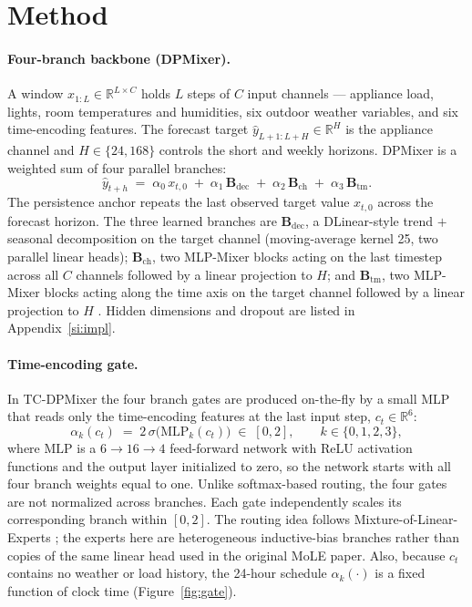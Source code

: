 \documentclass{article}
\begin{document}
\section{Method}
\label{sec:method}

\paragraph{Four-branch backbone (DPMixer).}
A window $x_{1:L}\in\mathbb{R}^{L\times C}$ holds $L$ steps of $C$
input channels --- appliance load, lights, room temperatures and
humidities, six outdoor weather variables, and six time-encoding
features. The forecast target
$\hat{y}_{L{+}1:L{+}H}\in\mathbb{R}^{H}$ is the appliance channel
and $H\in\{24, 168\}$ controls the short and weekly horizons.
DPMixer is a weighted sum of four parallel branches:
\begin{equation}
\hat{y}_{t+h}
\;=\; \alpha_{0}\,x_{t,0}
\;+\; \alpha_{1}\,\mathbf{B}_{\text{dec}}
\;+\; \alpha_{2}\,\mathbf{B}_{\text{ch}}
\;+\; \alpha_{3}\,\mathbf{B}_{\text{tm}}.
\label{eq:dpmixer}
\end{equation}
The persistence anchor repeats the last observed target value
$x_{t,0}$ across the forecast horizon. The three learned branches are
$\mathbf{B}_{\text{dec}}$, a DLinear-style trend $+$ seasonal
decomposition on the target channel \citep{dlinear} (moving-average
kernel 25, two parallel linear heads);
$\mathbf{B}_{\text{ch}}$, two MLP-Mixer blocks acting on the last
timestep across all $C$ channels followed by a linear projection to
$H$; and $\mathbf{B}_{\text{tm}}$, two MLP-Mixer blocks acting along
the time axis on the target channel followed by a linear projection
to $H$ \citep{tsmixer}. Hidden dimensions and dropout are listed in
Appendix~\ref{si:impl}.

\paragraph{Time-encoding gate.}
In TC-DPMixer the four branch gates are produced on-the-fly by a
small MLP that reads only the time-encoding features at the last
input step, $c_{t}\in\mathbb{R}^{6}$:
\begin{equation}
\alpha_{k}(c_{t})
\;=\; 2\,\sigma\!\big(\mathrm{MLP}_{k}(c_{t})\big)
\;\in\;[0, 2],
\qquad k\in\{0, 1, 2, 3\},
\label{eq:tc}
\end{equation}
where $\mathrm{MLP}$ is a $6\to 16\to 4$ feed-forward network with
ReLU activation functions and the output layer initialized to zero, so the
network starts with all four branch weights equal to one. Unlike softmax-based routing, the four gates are not normalized across branches. Each gate independently scales its corresponding branch within $[0,2]$. The routing idea
follows Mixture-of-Linear-Experts \citep{mole}; the experts here are
heterogeneous inductive-bias branches rather than copies of the same
linear head used in the original MoLE paper. Also, because $c_{t}$ contains
no weather or load history, the 24-hour schedule
$\alpha_{k}(\cdot)$ is a fixed function of clock time
(Figure~\ref{fig:gate}).
\end{document}
